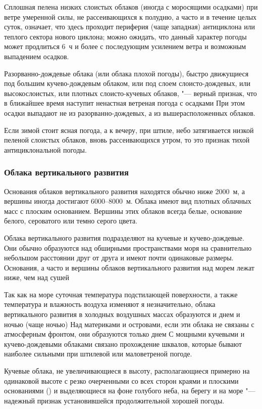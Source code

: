  Сплошная пелена низких слоистых облаков (иногда с моросящими
осадками) при ветре умеренной силы, не рассеивающихся к полудню, а
часто и в течение целых суток, означает, что здесь проходит периферия
(чаще западная) антициклона или теплого сектора нового циклона; можно
ожидать, что данный характер погоды может продлиться 6~ч и более с
последующим усилением ветра и возможным выпадением осадков.

 Разорванно-дождевые облака (или облака плохой погоды), быстро
движущиеся под большим кучево-дождевым облаком, или под слоем
слоисто-дождевых, или высокослоистых, или плотных слоисто-кучевых
облаков, "--- верный признак, что в ближайшее время наступит ненастная
ветреная погода с осадками При этом осадки выпадают не из
разорванно-дождевых, а из вышерасположенных облаков.

 Если зимой стоит ясная погода, а к вечеру, при штиле, небо
затягивается низкой пеленой слоистых облаков, вновь рассеивающихся
утром, то это признак тихой антициклональной погоды.

\subsubsection{Облака вертикального развития}

Основания облаков вертикального развития находятся обычно ниже 2000~м,
а вершины иногда достигают 6000--8000~м. Облака имеют вид плотных
облачных масс с плоским основанием. Вершины этих облаков всегда белые,
основание белого, сероватого или темно серого цвета.

Облака вертикального развития подразделяют на кучевые и
кучево-дождевые. Они обычно образуются над обширными пространствами
моря на сравнительно небольшом расстоянии друг от друга и имеют почти
одинаковые размеры. Основания, а часто и вершины облаков вертикального
развития над морем лежат ниже, чем над сушей

Так как на море суточная температура подстилающей поверхности, а также
температура и влажность воздуха изменяют я незначительно, облака
вертикального развития в холодных воздушных массах образуются и днем и
ночью (чаще ночью) Над материками и островами, если эти облака не
связаны с атмосферным фронтом, они образуются только днем С мощными
кучевыми и кучево-дождевыми облаками связано прохождение шквалов,
которые бывают наиболее сильными при штилевой или маловетреной погоде.

 Кучевые облака, не увеличивающиеся в высоту, располагающиеся
примерно на одинаковой высоте с резко очерченными со всех сторон
краями и плоскими основаниями () и выделяющиеся на фоне
голубого неба, на берегу и на море "--- надежный признак установившейся
продолжительной хорошей погоды.

